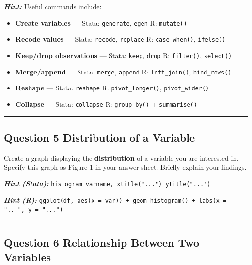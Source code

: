 \documentclass[paper=a4, fontsize=11pt]{scrartcl}
\newcommand{\horrule}[1]{\rule{\linewidth}{#1}}
\begin{document}
\medskip
\textit{\textbf{Hint:}} Useful commands include:
\begin{itemize}
  \item \textbf{Create variables} --- Stata: \texttt{generate}, \texttt{egen} \quad R: \texttt{mutate()}
  \item \textbf{Recode values} --- Stata: \texttt{recode}, \texttt{replace} \quad R: \texttt{case\_when()}, \texttt{ifelse()}
  \item \textbf{Keep/drop observations} --- Stata: \texttt{keep}, \texttt{drop} \quad R: \texttt{filter()}, \texttt{select()}
  \item \textbf{Merge/append} --- Stata: \texttt{merge}, \texttt{append} \quad R: \texttt{left\_join()}, \texttt{bind\_rows()}
  \item \textbf{Reshape} --- Stata: \texttt{reshape} \quad R: \texttt{pivot\_longer()}, \texttt{pivot\_wider()}
  \item \textbf{Collapse} --- Stata: \texttt{collapse} \quad R: \texttt{group\_by()} + \texttt{summarise()}
\end{itemize}

\bigskip\horrule{0.4pt}\bigskip


\subsection*{Question 5 \quad Distribution of a Variable}

Create a graph displaying the \textbf{distribution} of a variable you are interested in. Specify this graph as Figure 1 in your answer sheet. Briefly explain your findings.

\medskip
\textit{\textbf{Hint (Stata):}} \texttt{histogram varname, xtitle("...") ytitle("...")}

\textit{\textbf{Hint (R):}} \texttt{ggplot(df, aes(x = var)) + geom\_histogram() + labs(x = "...", y = "...")}

\bigskip\horrule{0.4pt}\bigskip


\subsection*{Question 6 \quad Relationship Between Two Variables}
\end{document}
